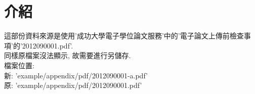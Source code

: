 
\section{介紹}
這部份資料來源是使用'成功大學電子學位論文服務'中的'電子論文上傳前檢查事項'的'2012090001.pdf'.\\

同樣原檔案沒法顯示, 故需要進行另儲存.\\

檔案位置:\\
新: 'example/appendix/pdf/2012090001-a.pdf'\\
原: 'example/appendix/pdf/2012090001.pdf'\\



\EndChapter
